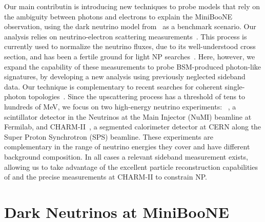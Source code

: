 Our main contributin is introducing new techniques to probe models that rely on the ambiguity between photons and electrons to explain the MiniBooNE observation, using the dark neutrino model from~\cite{Bertuzzo:2018itn,Bertuzzo:2018ftf} as a benchmark scenario. 
Our analysis relies on neutrino-electron scattering measurements~\cite{Auerbach:2001wg,Deniz:2009mu,Bellini:2011rx,Park:2013dax,Valencia:2019mkf,Park:2015eqa,Valencia-Rodriguez:2016vkf,DeWinter:1989zg,Geiregat:1992zv,Vilain:1994qy}. This process is currently used to normalize the neutrino fluxes, due to its well-understood cross section, and has been a fertile ground for light NP searches~\cite{Pospelov:2017kep,Lindner:2018kjo,Magill:2018tbb}. Here, however, we expand the capability of these measurements to probe BSM-produced photon-like signatures, by developing a new analysis using previously neglected sideband data. Our technique is complementary to recent searches for coherent single-photon topologies~\cite{Abe:2019cer}.
Since the upscattering process has a threshold of tens to hundreds of MeV, we focus on two high-energy neutrino experiments: \minerva~\cite{Park:2013dax,Valencia:2019mkf,Park:2015eqa,Valencia-Rodriguez:2016vkf}, a scintillator detector in the Neutrinos at the Main Injector (NuMI) beamline at Fermilab, and CHARM-II~\cite{DeWinter:1989zg,Geiregat:1992zv,Vilain:1994qy}, a segmented calorimeter detector at CERN along the Super Proton Synchrotron (SPS) beamline. These experiments are complementary in the range of neutrino energies they cover and have different background composition. In all cases a relevant sideband measurement exists, allowing us to take advantage of the excellent particle reconstruction capabilities of \minerva and the precise measurements at CHARM-II to constrain NP.
%

\section{Dark Neutrinos at MiniBooNE}

